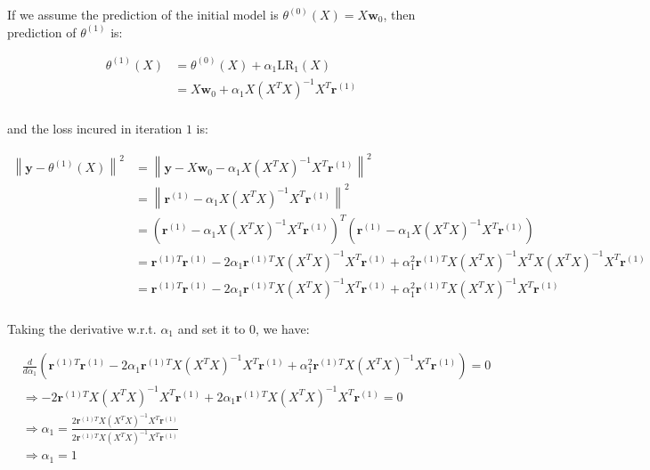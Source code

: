 \documentclass{article}
\begin{document}
If we assume the prediction of the initial model is $\theta^{(0)}(X) = X\mathbf{w}_0$, 
then prediction of $\theta^{(1)}$ is:

\begin{equation*}
\begin{split}
    \theta^{(1)}(X) 
    &= \theta^{(0)}(X) + \alpha_1 \mathrm{LR}_1(X) \\
    &= X\mathbf{w}_0 + \alpha_1 X (X^T X)^{-1} X^T \mathbf{r}^{(1)} \\
\end{split}
\end{equation*}

and the loss incured in iteration $1$ is:

\begin{equation*}
\begin{split}
    \left\| \mathbf{y} - \theta^{(1)}(X) \right\|^2 
    &= \left\| \mathbf{y} - X\mathbf{w}_0 - \alpha_1 X(X^T X)^{-1} X^T \mathbf{r}^{(1)} \right\|^2 \\
    &= \left\| \mathbf{r}^{(1)} - \alpha_1 X(X^T X)^{-1} X^T \mathbf{r}^{(1)} \right\|^2 \\
    &= \left(\mathbf{r}^{(1)} - \alpha_1 X(X^T X)^{-1} X^T \mathbf{r}^{(1)}\right)^T \left(\mathbf{r}^{(1)} - \alpha_1 X(X^T X)^{-1} X^T \mathbf{r}^{(1)}\right) \\
    &= \mathbf{r}^{(1)T} \mathbf{r}^{(1)} - 2\alpha_1 \mathbf{r}^{(1)T} X(X^T X)^{-1} X^T \mathbf{r}^{(1)} + \alpha_1^2 \mathbf{r}^{(1)T} X(X^T X)^{-1} X^T X(X^T X)^{-1} X^T \mathbf{r}^{(1)} \\
    &= \mathbf{r}^{(1)T} \mathbf{r}^{(1)} - 2\alpha_1 \mathbf{r}^{(1)T} X(X^T X)^{-1} X^T \mathbf{r}^{(1)} + \alpha_1^2 \mathbf{r}^{(1)T} X(X^T X)^{-1} X^T \mathbf{r}^{(1)} \\
\end{split}
\end{equation*}

Taking the derivative w.r.t. $\alpha_1$ and set it to $0$, we have:

\begin{equation*}
\begin{split}
    &\frac{d}{d\alpha_1} \left(\mathbf{r}^{(1)T} \mathbf{r}^{(1)} - 2\alpha_1 \mathbf{r}^{(1)T} X(X^T X)^{-1} X^T \mathbf{r}^{(1)} + \alpha_1^2 \mathbf{r}^{(1)T} X(X^T X)^{-1} X^T \mathbf{r}^{(1)}\right) = 0 \\
    &\Rightarrow -2 \mathbf{r}^{(1)T} X(X^T X)^{-1} X^T \mathbf{r}^{(1)} + 2\alpha_1 \mathbf{r}^{(1)T} X(X^T X)^{-1} X^T \mathbf{r}^{(1)} = 0 \\
    &\Rightarrow \alpha_1 = \frac{2 \mathbf{r}^{(1)T} X(X^T X)^{-1} X^T \mathbf{r}^{(1)}}{2\mathbf{r}^{(1)T} X(X^T X)^{-1} X^T \mathbf{r}^{(1)}}\\
    &\Rightarrow \alpha_1 = 1
\end{split}
\end{equation*}
\end{document}
